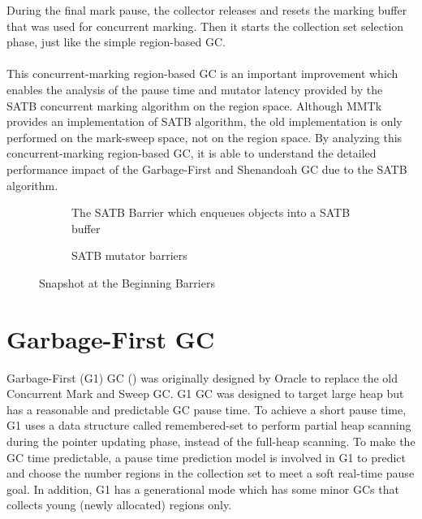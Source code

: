 During the final mark pause, the collector releases and resets the marking buffer that
was used for concurrent marking. Then it starts the collection set selection phase, just like the
simple region-based GC.
\\\\

This concurrent-marking region-based GC is an important improvement which enables
the analysis of the pause time and mutator latency provided by the SATB concurrent marking algorithm on the region space.
Although MMTk provides an implementation of SATB algorithm, the old implementation
is only performed on the mark-sweep space, not on the region space.
By analyzing this concurrent-marking region-based GC, it is able to understand the
detailed performance impact of the Garbage-First and Shenandoah GC due to the SATB algorithm.

\begin{figure}
  \centering
  \begin{subfigure}[a]{\textwidth}
    
    \caption{The SATB Barrier which enqueues objects into a SATB buffer}
    \label{fig:satb:enqueue}
  \end{subfigure}

  \begin{subfigure}[b]{\textwidth}
    
    \caption{SATB mutator barriers}
    \label{fig:satb:ofw}
  \end{subfigure}

  \caption{Snapshot at the Beginning Barriers}
  \label{fig:satbbarrier}
\end{figure}

\section{Garbage-First GC}
\label{sec:g1gc}

Garbage-First (G1) GC (\cite{detlefs2004garbage}) was originally designed by Oracle to replace
the old Concurrent Mark and Sweep GC. G1 GC was designed to target large heap but
has a reasonable and predictable GC pause time. To achieve a short pause time, G1
uses a data structure called remembered-set to perform partial heap scanning during the
pointer updating phase, instead of the full-heap scanning. To make the GC time predictable,
a pause time prediction model is involved in G1 to predict and choose the number regions in the
collection set to meet a soft real-time pause goal. In addition, G1 has a generational
mode which has some minor GCs that collects young (newly allocated) regions only.

